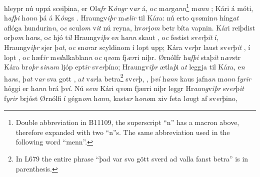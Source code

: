 hleypr   nú uppá  sceiþina, er Ol\textit{afr} K\textit{óngr} v\textit{ar} á, o\textit{c}  m\textit{ar}g\textit{an}\textit{n}\footnote{Double abbreviation in B11109, the superscript \enquote{n} has a macron above, therefore expanded with two \enquote{n}s. The same abbreviation used in the following word \enquote{menn}.} m\textit{an}\textit{n} ; 
Kári   á móti, 
h\textit{afþi} h\textit{ann} þá   á K\textit{ón}gs  . 
Hraungv\textit{iþr} m\textit{ælir} til  Kára: 
nú erto q\textit{vo}min\textit{n} híng\textit{at} aflóga hundurin\textit{n}, 
o\textit{c} scul\textit{om} v\textit{it} nú reyna, hv\textit{or}j\textit{om}
betr bíta vapnin. 
Kári reiþdist orþ\textit{om} h\textit{an}s,
o\textit{c} hjó t\textit{il} Hraungv\textit{iþs} 
e\textit{n} h\textit{ann}
skaut  , o\textit{c} festist sv\textit{er}þ\textit{it} í, 
Hraungv\textit{iþr} sjer þ\textit{at}, o\textit{c} sn\textit{ar}ar scyldinom í lopt upp;
Kára v\textit{er}þr laust sv\textit{er}þ\textit{it} ,   í lopt  , 
o\textit{c} hæf\textit{ir}  m\textit{ed}alkablan\textit{n} o\textit{c} q\textit{vo}m fj\textit{ær}ri  niþr. 
Ørnólfr h\textit{afþi} staþ\textit{it} n\textit{ær}str Kára br\textit{oþr} s\textit{inum}  ljóp ept\textit{ir} sv\textit{er}þíno; 
Hraungv\textit{iþr} ætla\textit{þ}i a\textit{t} leggja til  Kára, 
e\textit{n}  h\textit{an}s, þ\textit{at} v\textit{ar} sva gott  , a\textit{t} v\textit{ar}la   betra\footnote{
	In L679 the entire phrase \enquote{þad var svo gött sverd ad valla fanst betra} is in parenthesis.}  sv\textit{er}þ,  
, 
þ\textit{ví} h\textit{ann} kaus jafn\textit{an} m\textit{ann} f\textit{yrir} hỏggi  er h\textit{ann} brá þ\textit{ví}. 
Nú s\textit{em} Kári q\textit{vo}m fjærri niþr leggr Hr\textit{aung}v\textit{iþr} sv\textit{er}þ\textit{it} f\textit{yrir} brjóst Ørnólfi   í gégn\textit{om} h\textit{ann},   kast\textit{ar} h\textit{ono}m xiv feta  l\textit{an}gt af sv\textit{er}þino,  
